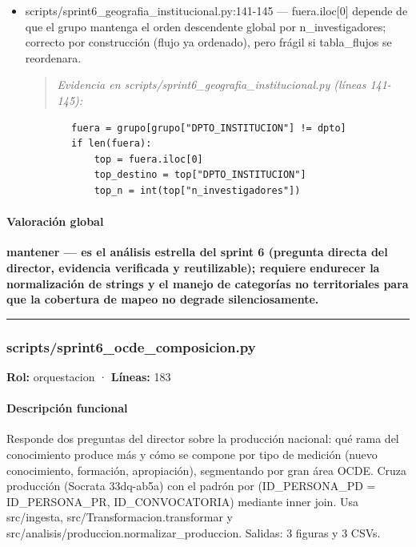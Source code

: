 \begin{tcolorbox}[riesgo]
\begin{itemize}
  \item scripts/sprint6\_geografia\_institucional.py:141-145 --- fuera.iloc[0] depende de que el grupo mantenga el orden descendente global por n\_investigadores; correcto por construcción (flujo ya ordenado), pero frágil si tabla\_flujos se reordenara.
\begin{quote}\footnotesize\ttfamily
\noindent\emph{Evidencia en scripts/sprint6\_geografia\_institucional.py (líneas 141-145):}
\end{quote}
\begin{lstlisting}
        fuera = grupo[grupo["DPTO_INSTITUCION"] != dpto]
        if len(fuera):
            top = fuera.iloc[0]
            top_destino = top["DPTO_INSTITUCION"]
            top_n = int(top["n_investigadores"])
\end{lstlisting}

\end{itemize}
\end{tcolorbox}

\paragraph{Valoración global}
\textbf{mantener --- es el análisis estrella del sprint 6 (pregunta directa del director, evidencia verificada y reutilizable); requiere endurecer la normalización de strings y el manejo de categorías no territoriales para que la cobertura de mapeo no degrade silenciosamente.}

\medskip
\hrule

\subsubsection{scripts/sprint6\_ocde\_composicion.py}
\textbf{Rol:} orquestacion · \textbf{Líneas:} 183

\paragraph{Descripción funcional}
Responde dos preguntas del director sobre la producción nacional: qué rama del conocimiento produce más y cómo se compone por tipo de medición (nuevo conocimiento, formación, apropiación), segmentando por gran área OCDE. Cruza producción (Socrata 33dq-ab5a) con el padrón por (ID\_PERSONA\_PD = ID\_PERSONA\_PR, ID\_CONVOCATORIA) mediante inner join. Usa src/ingesta, src/Transformacion.transformar y src/analisis/produccion.normalizar\_produccion. Salidas: 3 figuras y 3 CSVs.


